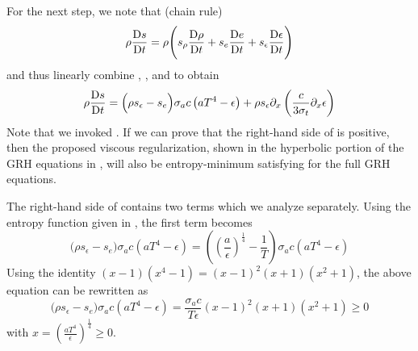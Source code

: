 \documentclass[review]{elsarticle}
\begin{document}
\noindent
For the next step, we note that (chain rule)
%
\begin{equation}
\rho \frac{\textrm{D} s}{\textrm{D} t} = \rho \Bigg( s_\rho \frac{\textrm{D} \rho}{\textrm{D} t} + s_e \frac{\textrm{D} e}{\textrm{D} t} +s_\epsilon \frac{\textrm{D} \epsilon}{\textrm{D} t} \Bigg)
\end{equation}
%
and thus linearly combine , , and  to obtain
%
\begin{equation} \label{eq:entro_eq_all_terms}
\rho \frac{\textrm{D} s}{\textrm{D} t} = \Big( \rho s_\epsilon -s_e \Big)  \sigma_a c \left( a T^4 - \epsilon \right) +   \rho s_\epsilon \partial_x \left( \frac{c}{3 \sigma_t} \partial_x \epsilon \right) 
\end{equation}
%
Note that we invoked .
If we can prove that the right-hand side of  is positive, then the proposed viscous regularization, shown in the hyperbolic portion of the GRH equations in , will
also be entropy-minimum satisfying for the full GRH equations. 

The right-hand side of  contains two terms which we analyze separately. Using the entropy function given in , the first term becomes
\begin{equation} 
\Big( \rho s_\epsilon -s_e \Big)  \sigma_a c \left( a T^4 - \epsilon \right) 
= \left( \left( \frac{a}{\epsilon}\right)^\frac{1}{4} - \frac{1}{T} \right)   \sigma_a c \left( a T^4 - \epsilon \right) 
\end{equation}
Using the identity $(x-1)(x^4-1) = (x-1)^2(x+1)(x^2+1)$, the above equation can be rewritten as
\begin{equation} 
\Big( \rho s_\epsilon -s_e \Big)  \sigma_a c \left( a T^4 - \epsilon \right) 
= \frac{\sigma_a c}{T \epsilon}  (x-1)^2(x+1)(x^2+1) \geq 0
\end{equation}
with $x=  \left(\frac{aT^4}{\epsilon}\right)^\frac{1}{4} \geq 0.$
\end{document}
